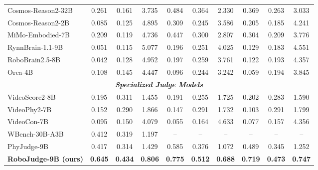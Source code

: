 \begin{table}[t]
\begin{tabular}{@{}l ccc ccc cc c@{}}
Cosmos-Reason2-32B~\citep{nvidia2025cosmosreason2}
& 0.261 & 0.161 & 3.735
& 0.484 & 0.364 & 2.330
& 0.369 & 0.263 & 3.033 \\

Cosmos-Reason2-2B~\citep{nvidia2025cosmosreason2}
& 0.085 & 0.125 & 4.895
& 0.309 & 0.245 & 3.586
& 0.205 & 0.185 & 4.241 \\

MiMo-Embodied-7B~\citep{hao2025mimoembodied}
& 0.209 & 0.119 & 4.736
& 0.447 & 0.300 & 2.807
& 0.304 & 0.209 & 3.776 \\

RynnBrain-1.1-9B~\citep{damo2026rynnbrain11}
& 0.051 & 0.115 & 5.077
& 0.196 & 0.251 & 4.025
& 0.129 & 0.183 & 4.551 \\

RoboBrain2.5-8B~\citep{tan2026robobrain25}
& 0.042 & 0.128 & 4.952
& 0.197 & 0.259 & 3.761
& 0.122 & 0.193 & 4.357 \\

Orca-4B~\citep{orca2026}
& 0.108 & 0.145 & 4.447
& 0.096 & 0.244 & 3.242
& 0.059 & 0.194 & 3.845 \\

\midrule
\multicolumn{10}{c}{\textit{\textbf{Specialized Judge Models}}}\\
\midrule
VideoScore2-8B~\citep{videoscore2}
& 0.195 & 0.311 & 1.455
& 0.191 & 0.255 & 1.725
& 0.202 & 0.283 & 1.590 \\

VideoPhy2-7B~\citep{bansal2026videophy}
& 0.152 & 0.290 & 1.866
& 0.147 & 0.291 & 1.732
& 0.103 & 0.291 & 1.799 \\

VideoCon-7B~\citep{bansal2024videocon}
& 0.095 & 0.150 & 4.079
& 0.055 & 0.164 & 4.633
& 0.077 & 0.157 & 4.356 \\

WBench-30B-A3B~\citep{ying2026wbench}
& 0.412 & 0.319 & 1.197
& -- & -- & --
& -- & -- & -- \\

PhyJudge-9B~\citep{lin2026phyground}
& 0.417 & 0.314 & 1.429
& 0.585 & 0.376 & 1.072
& 0.489 & 0.345 & 1.252 \\

\textbf{RoboJudge-9B (ours)}
& \textbf{0.645} & \textbf{0.434} & \textbf{0.806}
& \textbf{0.775} & \textbf{0.512} & \textbf{0.688}
& \textbf{0.719} & \textbf{0.473} & \textbf{0.747} \\

\hline
\end{tabular}
\end{table}
